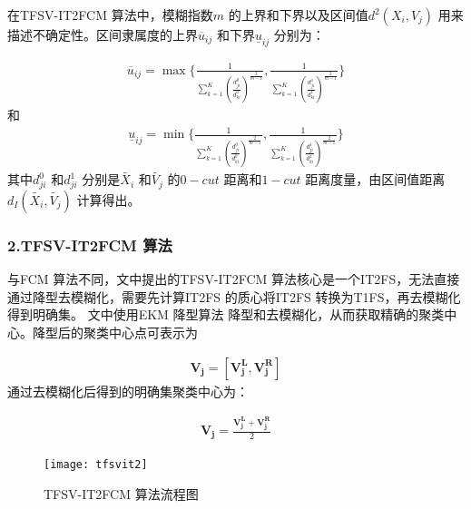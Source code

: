在TFSV-IT2FCM 算法中，模糊指数$m$ 的上界和下界以及区间值$d^2(X_i,V_j)$ 用来描述不确定性。区间隶属度的上界$\overline{u}_{ij}$ 和下界$\underline{u}_{ij}$ 分别为：

\begin{equation}\label{eq:13}
    \begin{split}
        \overline{u}_{ij} = \max \Bigg \lbrace \frac{1}{\sum_{k=1}^K {(\frac{d_{ji}^0}{d_{ki}^0})}^{\frac{2}{m-1}}}, \frac{1}{\sum_{k=1}^K {(\frac{d_{ji}^1}{d_{ki}^1})}^{\frac{2}{m-1}}} \Bigg \rbrace
    \end{split}
\end{equation}
和
\begin{equation}\label{eq:14}
    \begin{split}
        \underline{u}_{ij} = \min \Bigg \lbrace \frac{1}{\sum_{k=1}^K {(\frac{d_{ji}^0}{d_{ki}^0})}^{\frac{2}{m-1}}}, \frac{1}{\sum_{k=1}^K {(\frac{d_{ji}^1}{d_{ki}^1})}^{\frac{2}{m-1}}} \Bigg \rbrace
    \end{split}
\end{equation}
其中$d_{ji}^0$ 和$d_{ji}^1$ 分别是$\tilde{X_i}$ 和$\tilde{V_j}$ 的$0-cut$ 距离和$1-cut$ 距离度量，由区间值距离$d_{I} (\tilde{X_i}, \tilde{V_j})$ 计算得出。


\subsubsection*{2.TFSV-IT2FCM 算法}
\label{subsubsec::chap03-3-3-2-2}
与FCM 算法不同，文中提出的TFSV-IT2FCM 算法核心是一个IT2FS，无法直接通过降型去模糊化，需要先计算IT2FS 的质心将IT2FS 转换为T1FS，再去模糊化得到明确集\cite{karnik2001centroid}。 文中使用EKM 降型算法\cite{wu2009enhanced} 降型和去模糊化，从而获取精确的聚类中心。降型后的聚类中心点可表示为

\begin{equation}\label{eq:17}
    \begin{split}
        \bm{V_j} = [\bm{V_j^L}, \bm{V_j^R}]
    \end{split}
\end{equation}
通过去模糊化后得到的明确集聚类中心为：

\begin{equation}\label{eq:18}
    \begin{split}
        \bm{V_j} = \frac{\bm{V_j^L}+\bm{V_j^R}}{2}
    \end{split}
\end{equation}

\begin{figure}[htbp]
    \centering
    \texttt{[image: tfsvit2]}
    \caption{TFSV-IT2FCM 算法流程图}
    \label{fig:tfsvit2}
\end{figure}

